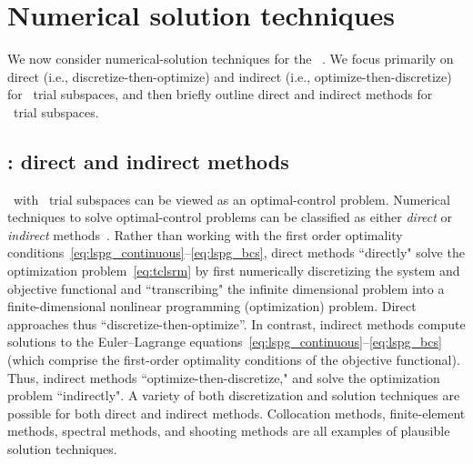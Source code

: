 \section{Numerical solution techniques}\label{sec:numerical_techniques}
We now consider numerical-solution techniques for the \methodAcronym\ \approachKwd.
We focus primarily on 
direct (i.e., discretize-then-optimize) and indirect (i.e., optimize-then-discretize) for \spatialAcronym\ trial subspaces, 
and then briefly outline direct and indirect methods for \spaceTimeAcronym\ trial subspaces. 
\subsection{\spatialAcronym: direct and indirect methods}
\methodAcronym\ with \spatialAcronym\ trial subspaces can be viewed as an optimal-control problem.
Numerical techniques to
solve optimal-control problems can be classified as either
\textit{direct} or \textit{indirect}
methods~\cite{conway_optimalcontrolreview}. Rather than working with the first order optimality conditions~\eqref{eq:lspg_continuous}--\eqref{eq:lspg_bcs}, direct methods ``directly" solve the optimization problem~\eqref{eq:tclsrm} by first
numerically discretizing the system and objective functional and ``transcribing"
the infinite dimensional problem into a finite-dimensional nonlinear
programming (optimization) problem. Direct approaches thus
``discretize-then-optimize''.
In contrast, indirect methods compute solutions to the Euler--Lagrange equations~\eqref{eq:lspg_continuous}--\eqref{eq:lspg_bcs} (which comprise the first-order optimality conditions of the objective functional). Thus, indirect methods ``optimize-then-discretize," and solve the optimization problem
``indirectly". A variety of both discretization and solution techniques are possible
for both direct and indirect methods. Collocation methods,
finite-element methods, spectral methods, and shooting methods are all examples of
plausible solution techniques.  

